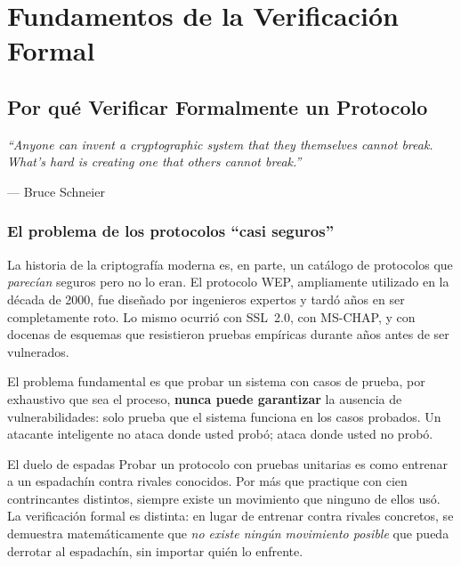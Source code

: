 \documentclass[12pt, a4paper, twoside, openright]{book}
\begin{document}
\part{Fundamentos de la Verificaci\'on Formal}

\chapter{Por qu\'e Verificar Formalmente un Protocolo}

\epigraph{%
  \textit{``Anyone can invent a cryptographic system that they
  themselves cannot break. What's hard is creating one that
  others cannot break.''}
}{--- Bruce Schneier}

\section{El problema de los protocolos ``casi seguros''}

La historia de la criptograf\'ia moderna es, en parte, un cat\'alogo
de protocolos que \textit{parec\'ian} seguros pero no lo eran.
El protocolo WEP, ampliamente utilizado en la d\'ecada de 2000,
fue dise\~nado por ingenieros expertos y tard\'o a\~nos en ser
completamente roto. Lo mismo ocurri\'o con SSL~2.0, con MS-CHAP,
y con docenas de esquemas que resistieron pruebas emp\'iricas durante
a\~nos antes de ser vulnerados.

\medskip

El problema fundamental es que probar un sistema con casos de prueba,
por exhaustivo que sea el proceso, \textbf{nunca puede garantizar}
la ausencia de vulnerabilidades: solo prueba que el sistema funciona
en los casos probados. Un atacante inteligente no ataca donde usted
prob\'o; ataca donde usted no prob\'o.

\begin{cajaAnalogia}{El duelo de espadas}
  Probar un protocolo con pruebas unitarias es como entrenar a un
  espadach\'in contra rivales conocidos. Por m\'as que practique
  con cien contrincantes distintos, siempre existe un movimiento
  que ninguno de ellos us\'o. La verificaci\'on formal es distinta:
  en lugar de entrenar contra rivales concretos, se demuestra
  matem\'aticamente que \textit{no existe ning\'un movimiento posible}
  que pueda derrotar al espadach\'in, sin importar qui\'en lo enfrente.
\end{cajaAnalogia}
\end{document}

